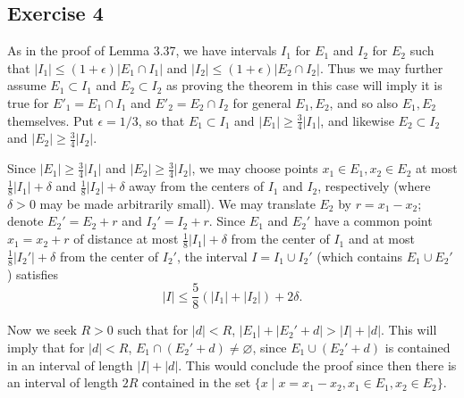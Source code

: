 \documentclass{article}
\newcommand\abs[1]{\left|#1\right|}
\let\emptyset\varnothing
\begin{document}
\subsection{Exercise 4} %
As in the proof of Lemma 3.37, we have intervals $I_{1}$ for $E_{1}$ and $I_{2}$ for $E_{2}$ such that $\abs{I_{1}} \leq (1 + \epsilon) \abs{E_{1} \cap I_{1}}$ and $\abs{I_{2}} \leq (1 + \epsilon) \abs{E_{2} \cap I_{2}}$. Thus we may further assume $E_{1} \subset I_{1}$ and $E_{2} \subset I_{2}$ as proving the theorem in this case will imply it is true for $E'_{1} = E_{1} \cap I_{1}$ and $E'_{2} = E_{2} \cap I_{2}$ for general $E_{1}, E_{2}$, and so also $E_{1}, E_{2}$ themselves. Put $\epsilon = 1/3$, so that $E_{1} \subset I_{1}$ and $\abs{E_{1}} \geq \frac{3}{4}\abs{I_{1}}$, and likewise $E_{2} \subset I_{2}$ and $\abs{E_{2}} \geq \frac{3}{4}\abs{I_{2}}$.

Since $\abs{E_{1}} \geq \frac{3}{4}\abs{I_{1}}$ and $\abs{E_{2}} \geq \frac{3}{4}\abs{I_{2}}$, we may choose points $x_{1} \in E_{1}, x_{2} \in E_{2}$ at most $\frac{1}{8}\abs{I_{1}} + \delta$ and $\frac{1}{8}\abs{I_{2}} + \delta$ away from the centers of $I_{1}$ and $I_{2}$, respectively (where $\delta > 0$ may be made arbitrarily small). We may translate $E_{2}$ by $r = x_{1} - x_{2}$; denote $E_{2}' = E_{2} + r$ and $I_{2}' = I_{2} + r$. Since $E_{1}$ and $E_{2}'$ have a common point $x_{1} = x_{2} + r$ of distance at most $\frac{1}{8}\abs{I_{1}} + \delta$ from the center of $I_{1}$ and at most $\frac{1}{8}\abs{I_{2}'}
+ \delta$ from the center of $I_{2}'$, the interval $I = I_{1} \cup I_{2}'$ (which contains $E_{1} \cup E_{2}'$) satisfies 
\begin{equation*}
	\abs{I} \leq \frac{5}{8}(\abs{I_{1}} + \abs{I_{2}}) + 2\delta.
\end{equation*}

Now we seek $R > 0$ such that for $\abs{d} < R$, $\abs{E_{1}} + \abs{E_{2}' + d} > \abs{I} + \abs{d}$. This will imply that for $\abs{d} < R$, $E_{1} \cap (E_{2}' + d) \neq \emptyset$, since $E_{1} \cup (E_{2}' + d)$ is contained in an interval of length $\abs{I} + \abs{d}$. This would conclude the proof since then there is an interval of length $2R$ contained in the set $\{ x \mid x = x_{1} - x_{2}, x_{1} \in E_{1}, x_{2} \in E_{2}\}$.
\end{document}
